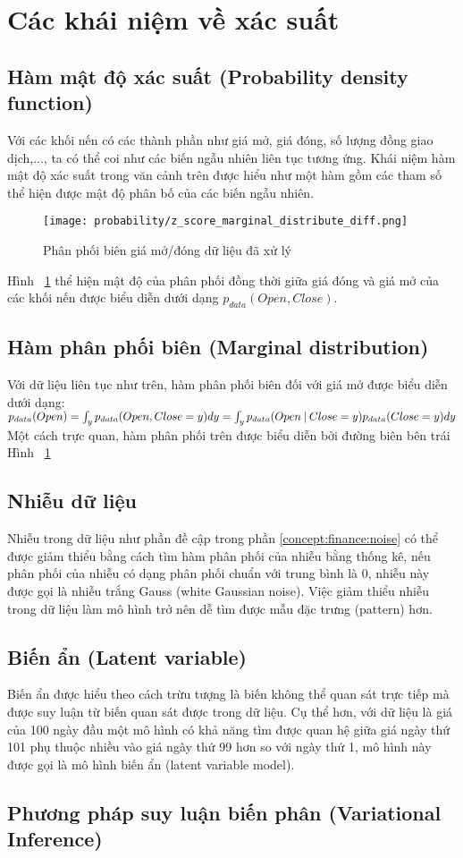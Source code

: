 \section{Các khái niệm về xác suất}
\subsection{Hàm mật độ xác suất (Probability density function)}
Với các khối nến có các thành phần như giá mở, giá đóng, số lượng đồng giao dịch,..., ta có thể coi như các biến ngẫu nhiên liên tục tương ứng. Khái niệm hàm mật độ xác suất trong văn cảnh trên được hiểu như một hàm gồm các tham số thể hiện được mật độ phân bố của các biến ngẫu nhiên.
\begin{figure}[hbt!]
	\centering
	\texttt{[image: probability/z\_score\_marginal\_distribute\_diff.png]}
	\caption{Phân phối biên giá mở/đóng dữ liệu đã xử lý}
	\label{fig:z_score_marginal_distribution_diff}
\end{figure}
\FloatBarrier
Hình ~\ref{fig:z_score_marginal_distribution_diff} thể hiện mật độ của phân phối đồng thời giữa giá đóng và giá mở của các khối nến được biểu diễn dưới dạng $p_{data}(Open, Close)$.
\subsection{Hàm phân phối biên (Marginal distribution)}
Với dữ liệu liên tục như trên, hàm phân phối biên đối với giá mở được biểu diễn dưới dạng:
$p_{data}(Open) = \int_y p_{data}(Open, Close=y) dy = \int_y p_{data}(Open \:\lvert\: Close=y)p_{data}(Close=y)dy$ Một cách trực quan, hàm phân phối trên được biểu diễn bởi đường biên bên trái Hình ~\ref{fig:z_score_marginal_distribution_diff}

\subsection{Nhiễu dữ liệu}
Nhiễu trong dữ liệu như phần đề cập trong phần \ref{concept:finance:noise} có thể được giảm thiểu bằng cách tìm hàm phân phối của nhiễu bằng thống kê, nếu phân phối của nhiễu có dạng phân phối chuẩn với trung bình là 0, nhiễu này được gọi là nhiễu trắng Gauss (white Gaussian noise). Việc giảm thiểu nhiễu trong dữ liệu làm mô hình trở nên dễ tìm được mẫu đặc trưng (pattern) hơn.

\subsection{Biến ẩn (Latent variable)}
Biến ẩn được hiểu theo cách trừu tượng là biến không thể quan sát trực tiếp\cite{bishop} mà được suy luận từ biến quan sát được trong dữ liệu. Cụ thể hơn, với dữ liệu là giá của 100 ngày đầu một mô hình có khả năng tìm được quan hệ giữa giá ngày thứ 101 phụ thuộc nhiều vào giá ngày thứ 99 hơn so với ngày thứ 1, mô hình này được gọi là mô hình biến ẩn (latent variable model).
\subsection{Phương pháp suy luận biến phân (Variational Inference)}
